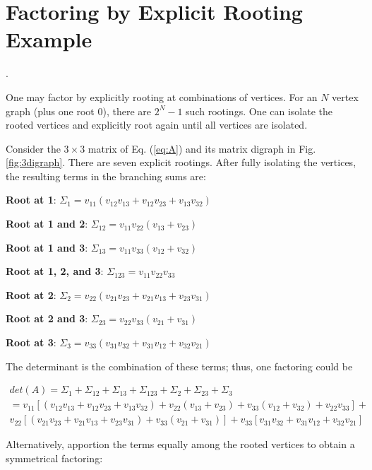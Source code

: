 \documentclass[review,supplement,hidelinks,onefignum,onetabnum]{siamart220329}
\begin{document}
 \section{Factoring by Explicit Rooting Example}. 

One may factor by explicitly rooting at combinations of vertices.  For an $N$ vertex graph (plus one root 0), there are $2^N - 1$ such rootings.  One can isolate the rooted vertices and explicitly root again until all vertices are isolated.

Consider the $3 \times 3$ matrix of Eq. (\ref{eq:A}) and its matrix digraph in Fig. \ref{fig:3digraph}.  There are seven explicit rootings.  After fully isolating the vertices, the resulting terms in the branching sums are:

{\bf Root at 1}: $\Sigma_1 = v_{11} \left(v_{12} v_{13} + v_{12} v_{23} + v_{13} v_{32}\right)$

{\bf Root at 1 and 2}: $\Sigma_{12} = v_{11} v_{22} \left( v_{13} + v_{23}\right)$

{\bf Root at 1 and 3}: $\Sigma_{13} = v_{11} v_{33} \left( v_{12} + v_{32}\right)$

{\bf Root at 1, 2, and 3}: $\Sigma_{123} = v_{11} v_{22} v_{33}$

{\bf Root at 2}: $\Sigma_2 = v_{22} \left(v_{21} v_{23} + v_{21} v_{13} + v_{23} v_{31}\right)$

{\bf Root at 2 and 3}: $\Sigma_{23} = v_{22} v_{33} \left(v_{21} + v_{31}\right)$

{\bf Root at 3}: $\Sigma_3 = v_{33} \left(v_{31} v_{32} + v_{31} v_{12} + v_{32} v_{21}\right)$

The determinant is the combination of these terms; thus, one factoring could be

\begin{equation}
    \begin{split}
    det(A) = \Sigma_1 + \Sigma_{12} + \Sigma_{13} + \Sigma_{123} + \Sigma_2 + \Sigma_{23} + \Sigma_3 \\
    = v_{11} [\left(v_{12} v_{13} + v_{12} v_{23} + v_{13} v_{32}\right) + v_{22} \left(v_{13} + v_{23}\right) + v_{33} \left(v_{12} + v_{32}\right) + v_{22} v_{33}]+\\
    v_{22} [\left(v_{21} v_{23} + v_{21} v_{13} + v_{23} v_{31}\right) + v_{33} \left(v_{21} + v_{31}\right)] + v_{33} [v_{31} v_{32} + v_{31} v_{12} + v_{32} v_{21}]
    \end{split}
\end{equation}

Alternatively, apportion the terms equally among the rooted vertices to obtain a symmetrical factoring:
\end{document}

